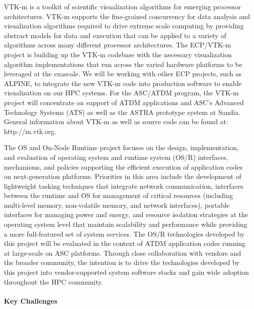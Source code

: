 VTK-m is a toolkit of scientific visualization algorithms for emerging processor architectures. VTK-m supports the fine-grained concurrency for data analysis and visualization algorithms required to drive extreme scale computing by providing abstract models for data and execution that can be applied to a variety of algorithms across many different processor architectures.  The ECP/VTK-m project is building up the VTK-m codebase with the necessary visualization algorithm implementations that run across the varied hardware platforms to be leveraged at the exascale. We will be working with other ECP projects, such as ALPINE, to integrate the new VTK-m code into production software to enable visualization on our HPC systems.  For the ASC/ATDM program, the VTK-m project will concentrate on support of ATDM applications and ASC’s Advanced Technology Systems (ATS) as well as the ASTRA prototype system at Sandia.  General information about VTK-m as well as source code can be found at: http://m.vtk.org.

The OS and On-Node Runtime project focuses on the design, implementation, and evaluation of operating system and runtime system (OS/R) interfaces, mechanisms, and policies supporting the efficient execution of application codes on next-generation platforms. Priorities in this area include the development of lightweight tasking techniques that integrate network communication, interfaces between the runtime and OS for management of critical resources (including multi-level memory, non-volatile memory, and network interfaces), portable interfaces for managing power and energy, and resource isolation strategies at the operating system level that maintain scalability and performance while providing a more full-featured set of system services. The OS/R technologies developed by this project will be evaluated in the context of ATDM application codes running at large-scale on ASC platforms. Through close collaboration with vendors and the broader community, the intention is to drive the technologies developed by this project into vendor-supported system software stacks and gain wide adoption throughout the HPC community.

\paragraph{Key  Challenges}

